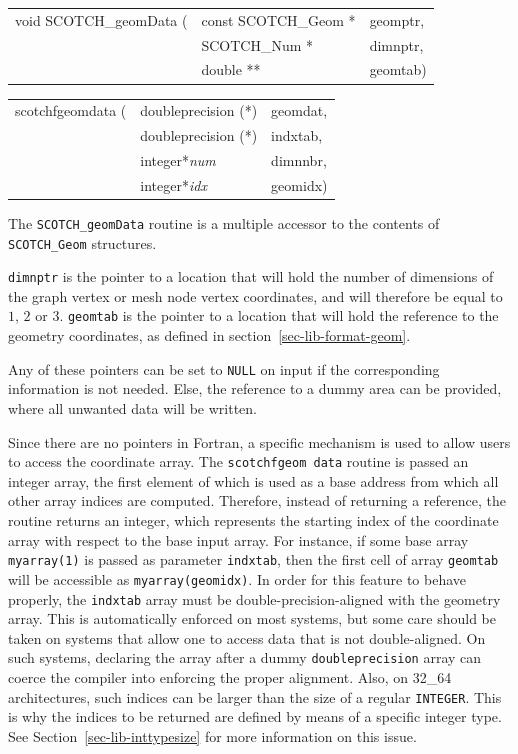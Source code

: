 \begin{itemize}
\progsyn

{\tt\begin{tabular}{l@{}ll}
void SCOTCH\_geomData ( & const SCOTCH\_Geom * & geomptr, \\
                        & SCOTCH\_Num *        & dimnptr, \\
                        & double **            & geomtab)
\end{tabular}}

{\tt\begin{tabular}{l@{}ll}
scotchfgeomdata ( & doubleprecision (*) & geomdat, \\
                  & doubleprecision (*) & indxtab, \\
                  & integer*{\it num}   & dimnnbr, \\
                  & integer*{\it idx}   & geomidx)
\end{tabular}}

\progdes

The {\tt SCOTCH\_geomData} routine is a multiple
accessor to the contents of {\tt SCOTCH\_Geom} structures.

{\tt dimnptr} is the pointer to a location that will hold the
number of dimensions of the graph vertex or mesh node vertex
coordinates, and will therefore be equal to $1$, $2$ or $3$.
{\tt geomtab} is the pointer to a location that will hold the
reference to the geometry coordinates, as defined in
section~\ref{sec-lib-format-geom}.

Any of these pointers can be set to {\tt NULL} on input if the
corresponding information is not needed. Else, the reference to a
dummy area can be provided, where all unwanted data will be written.

Since there are no pointers in Fortran, a specific mechanism is used
to allow users to access the coordinate array. The {\tt scotchf\lbt geom\lbt
data} routine is passed an integer array, the first element of which is used
as a base address from which all other array indices are
computed. Therefore, instead of returning a reference, the routine
returns an integer, which represents the starting index of the coordinate
array with respect to the base input array. For
instance, if some base array {\tt myarray\lbt (1)} is passed as
parameter {\tt indxtab}, then the first cell of array {\tt geomtab}
will be accessible as {\tt myarray\lbt (geomidx)}.
In order for this feature to behave properly, the {\tt indxtab}
array must be double-precision-aligned with the geometry array. This is
automatically enforced on most systems, but some care should be
taken on systems that allow one to access data that is not
double-aligned. On such systems, declaring the array after a
dummy {\tt double\lbt precision} array can coerce the compiler
into enforcing the proper alignment. Also, on 32\_64 architectures,
such indices can be larger than the size of a regular
{\tt INTEGER}. This is why the indices to be returned are defined by
means of a specific integer type. See
Section~\ref{sec-lib-inttypesize} for more information on this
issue.
\end{itemize}

